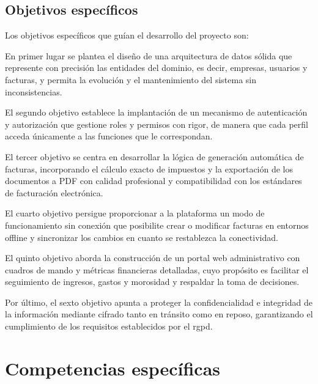 \subsection{Objetivos específicos}

\begin{large}
Los objetivos específicos que guían el desarrollo del proyecto son:

En primer lugar se plantea el diseño de una arquitectura de datos sólida que represente con precisión las entidades del dominio, es decir, empresas, usuarios y facturas, y permita la evolución y el mantenimiento del sistema sin inconsistencias.

El segundo objetivo establece la implantación de un mecanismo de autenticación y autorización que gestione roles y permisos con rigor, de manera que cada perfil acceda únicamente a las funciones que le correspondan.

El tercer objetivo se centra en desarrollar la lógica de generación automática de facturas, incorporando el cálculo exacto de impuestos y la exportación de los documentos a PDF con calidad profesional y compatibilidad con los estándares de facturación electrónica.

El cuarto objetivo persigue proporcionar a la plataforma un modo de funcionamiento sin conexión que posibilite crear o modificar facturas en entornos offline y sincronizar los cambios en cuanto se restablezca la conectividad.

El quinto objetivo aborda la construcción de un portal web administrativo con cuadros de mando y métricas financieras detalladas, cuyo propósito es facilitar el seguimiento de ingresos, gastos y morosidad y respaldar la toma de decisiones.

Por último, el sexto objetivo apunta a proteger la confidencialidad e integridad de la información mediante cifrado tanto en tránsito como en reposo, garantizando el cumplimiento de los requisitos establecidos por el \gls{rgpd}.
\end{large}

\section{Competencias específicas}


